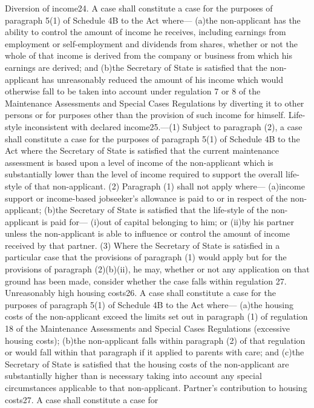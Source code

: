\documentclass[a4paper]{article}
\begin{document}
Diversion of income24. A case shall constitute a case for the purposes of
paragraph 5(1) of Schedule 4B to the Act where—
(a)the non-applicant has the ability to control the amount of income he
receives, including earnings from employment or self-employment and dividends
from shares, whether or not the whole of that income is derived from the company
or business from which his earnings are derived; and
(b)the Secretary of State is satisfied that the non-applicant has unreasonably
reduced the amount of his income which would otherwise fall to be taken into
account under regulation 7 or 8 of the Maintenance Assessments and Special Cases
Regulations by diverting it to other persons or for purposes other than the
provision of such income for himself.
Life-style inconsistent with declared income25.—(1) Subject to paragraph (2), a
case shall constitute a case for the purposes of paragraph 5(1) of Schedule 4B
to the Act where the Secretary of State is satisfied that the current
maintenance assessment is based upon a level of income of the non-applicant
which is substantially lower than the level of income required to support the
overall life-style of that non-applicant.
(2) Paragraph (1) shall not apply where—
(a)income support or income-based jobseeker’s allowance is paid to or in respect
of the non-applicant;
(b)the Secretary of State is satisfied that the life-style of the non-applicant
is paid for—
(i)out of capital belonging to him; or
(ii)by his partner unless the non-applicant is able to influence or control the
amount of income received by that partner.
(3) Where the Secretary of State is satisfied in a particular case that the
provisions of paragraph (1) would apply but for the provisions of paragraph
(2)(b)(ii), he may, whether or not any application on that ground has been made,
consider whether the case falls within regulation 27.
Unreasonably high housing costs26. A case shall constitute a case for the
purposes of paragraph 5(1) of Schedule 4B to the Act where—
(a)the housing costs of the non-applicant exceed the limits set out in paragraph
(1) of regulation 18 of the Maintenance Assessments and Special Cases
Regulations (excessive housing costs);
(b)the non-applicant falls within paragraph (2) of that regulation or would fall
within that paragraph if it applied to parents with care; and
(c)the Secretary of State is satisfied that the housing costs of the
non-applicant are substantially higher than is necessary taking into account any
special circumstances applicable to that non-applicant.
Partner’s contribution to housing costs27. A case shall constitute a case for
\end{document}
